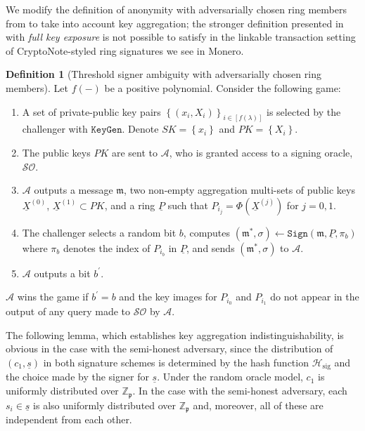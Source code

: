 \documentclass{mrl}
\theoremstyle{definition}
\numberwithin{theorem}{subsection}
\newtheorem{defn}[theorem]{Definition}
\newcommand{\adversary}{\mathcal{A}}
\begin{document}
We modify the definition of anonymity with adversarially chosen ring members from \cite{bender2006ring} to take into account key aggregation; the stronger definition presented in \cite{bender2006ring} with \textit{full key exposure} is not possible to satisfy in the linkable transaction setting of CryptoNote-styled ring signatures we see in Monero.

\begin{defn}[Threshold signer ambiguity with adversarially chosen ring members]
Let $f(-)$ be a positive polynomial. Consider the following game:
\begin{enumerate}
\item A set of private-public key pairs $\left\{(x_i, X_i)\right\}_{i\in [f(\lambda)]}$ is selected by the challenger with $\texttt{KeyGen}$. Denote $SK = \left\{x_i\right\}$ and $PK = \left\{X_i\right\}$. 

\item The public keys $PK$ are sent to $\adversary$, who is granted access to a signing oracle, $\mathcal{SO}$.

\item $\adversary$ outputs a message $\mathfrak{m}$,  two non-empty aggregation multi-sets of public keys $\underline{X}^{(0)}$, $\underline{X}^{(1)} \subset PK$, and a ring $\underline{P}$ such that $P_{i_j} = \Phi(\underline{X}^{(j)})$ for $j = 0, 1$.

\item The challenger selects a random bit $b$, computes $(\mathfrak{m}^*, \sigma) \leftarrow \texttt{Sign}(\mathfrak{m}, \underline{P}, \pi_b)$ where $\pi_b$ denotes the index of $P_{i_b}$ in $\underline{P}$, and sends $(\mathfrak{m}^*, \sigma)$ to $\adversary$.

\item $\adversary$ outputs a bit $b^\prime$. 
\end{enumerate} $\adversary$ wins the game if $b^\prime = b$ and the key images for $P_{i_0}$ and $P_{i_1}$ do not appear in the output of any query made to $\mathcal{SO}$ by $\adversary$.
\end{defn} 

The following lemma, which establishes key aggregation indistinguishability, is obvious in the case with the semi-honest adversary, since the distribution of $(c_1, \underline{s})$ in both signature schemes is determined by the hash function $\mathcal{H}_{\text{sig}}$ and the choice made by the signer for $\underline{s}$. Under the random oracle model, $c_1$ is uniformly distributed over $\mathbb{Z}_\mathfrak{p}$. In the case with the semi-honest adversary, each $s_i \in \underline{s}$ is also uniformly distributed over $\mathbb{Z}_\mathfrak{p}$ and, moreover, all of these are independent from each other. 
\end{document}
